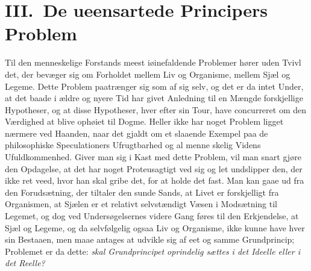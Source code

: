 \documentclass[12pt]{article}
\newcommand{\opage}[1]{\marginnote{\footnotesize\textit{[#1]}}}
\begin{document}
\section*{III.\ De ueensartede Principers Problem}
%
%
%
%

Til den menneskelige Forstands meest iøinefaldende Problemer hører
uden Tvivl det, der bevæger sig om Forholdet mellem Liv og
Organisme, mellem Sjæl og Legeme. Dette Problem paatrænger sig som
af sig selv, og det er da intet Under, at det baade i ældre og nyere
Tid har givet Anledning til en Mængde forskjellige Hypotheser, og at
disse Hypotheser, hver efter sin Tour, have concurreret om den
Værdighed at blive ophøiet til Dogme. Heller ikke har noget Problem
ligget nærmere ved Haanden, naar det gjaldt om et slaaende Exempel
paa de philosophiske Speculationers Ufrugtbarhed og al menne%
\opage{51}skelig Videns Ufuldkommenhed. Giver man sig i Kast med dette
Problem, vil man snart gjøre den Opdagelse, at det har noget
Proteusagtigt ved sig og let undslipper den, der ikke ret veed, hvor
han skal gribe det, for at holde det fast. Man kan gaae ud fra den
Forudsætning, der tiltaler den sunde Sands, at Livet er forskjelligt
fra Organismen, at Sjælen er et relativt selvstændigt Væsen i
Modsætning til Legemet, og dog ved Undersøgelsernes videre Gang
føres til den Erkjendelse, at Sjæl og Legeme, og da selvfølgelig
ogsaa Liv og Organisme, ikke kunne have hver sin Bestaaen, men maae
antages at udvikle sig af eet og samme Grundprincip; Problemet er da
dette: \emph{skal Grundprincipet oprindelig sættes i det Ideelle
eller i det Reelle?}
\end{document}
